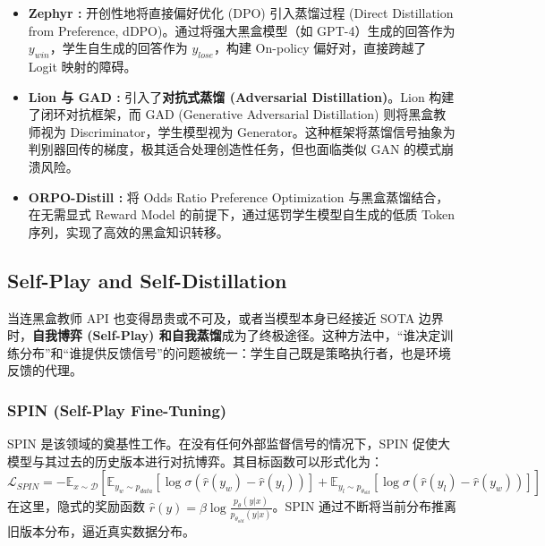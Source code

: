 \documentclass{article}
\begin{document}
\begin{itemize}
    \item \textbf{Zephyr \cite{2310.06694}:} 开创性地将直接偏好优化 (DPO) 引入蒸馏过程 (Direct Distillation from Preference, dDPO)。通过将强大黑盒模型（如 GPT-4）生成的回答作为 $y_{win}$，学生自生成的回答作为 $y_{lose}$，构建 On-policy 偏好对，直接跨越了 Logit 映射的障碍。
    \item \textbf{Lion 与 GAD \cite{lion2023, gad2025}:} 引入了\textbf{对抗式蒸馏 (Adversarial Distillation)}。Lion 构建了闭环对抗框架，而 GAD (Generative Adversarial Distillation) 则将黑盒教师视为 Discriminator，学生模型视为 Generator。这种框架将蒸馏信号抽象为判别器回传的梯度，极其适合处理创造性任务，但也面临类似 GAN 的模式崩溃风险。
    \item \textbf{ORPO-Distill \cite{2509.25100}:} 将 Odds Ratio Preference Optimization 与黑盒蒸馏结合，在无需显式 Reward Model 的前提下，通过惩罚学生模型自生成的低质 Token 序列，实现了高效的黑盒知识转移。
\end{itemize}

\subsection{Self-Play and Self-Distillation}
\label{subsec:self_play}

当连黑盒教师 API 也变得昂贵或不可及，或者当模型本身已经接近 SOTA 边界时，\textbf{自我博弈 (Self-Play) 和自我蒸馏}成为了终极途径。这种方法中，“谁决定训练分布”和“谁提供反馈信号”的问题被统一：学生自己既是策略执行者，也是环境反馈的代理。

\subsubsection{SPIN (Self-Play Fine-Tuning) \cite{2401.01335}}
SPIN 是该领域的奠基性工作。在没有任何外部监督信号的情况下，SPIN 促使大模型与其过去的历史版本进行对抗博弈。其目标函数可以形式化为：
\begin{equation}
    \mathcal{L}_{SPIN} = -\mathbb{E}_{x \sim \mathcal{D}} \left[ \mathbb{E}_{y_w \sim p_{data}} [\log \sigma(\hat{r}(y_w) - \hat{r}(y_l))] + \mathbb{E}_{y_l \sim p_{\theta_{old}}} [\log \sigma(\hat{r}(y_l) - \hat{r}(y_w))] \right]
\end{equation}
在这里，隐式的奖励函数 $\hat{r}(y) = \beta \log \frac{p_\theta(y|x)}{p_{\theta_{old}}(y|x)}$。SPIN 通过不断将当前分布推离旧版本分布，逼近真实数据分布。
\end{document}
